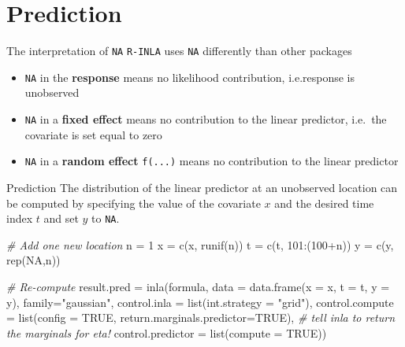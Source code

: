 \documentclass[
  ignorenonframetext,
]{beamer}
\newenvironment{Shaded}{\begin{snugshade}}{\end{snugshade}}
\newcommand{\AttributeTok}[1]{\textcolor[rgb]{0.77,0.63,0.00}{#1}}
\newcommand{\CommentTok}[1]{\textcolor[rgb]{0.56,0.35,0.01}{\textit{#1}}}
\newcommand{\ConstantTok}[1]{\textcolor[rgb]{0.00,0.00,0.00}{#1}}
\newcommand{\DecValTok}[1]{\textcolor[rgb]{0.00,0.00,0.81}{#1}}
\newcommand{\FunctionTok}[1]{\textcolor[rgb]{0.00,0.00,0.00}{#1}}
\newcommand{\NormalTok}[1]{#1}
\newcommand{\OtherTok}[1]{\textcolor[rgb]{0.56,0.35,0.01}{#1}}
\newcommand{\SpecialCharTok}[1]{\textcolor[rgb]{0.00,0.00,0.00}{#1}}
\newcommand{\StringTok}[1]{\textcolor[rgb]{0.31,0.60,0.02}{#1}}
\begin{document}
\hypertarget{prediction}{%
\section{Prediction}\label{prediction}}

\begin{frame}[fragile]{The interpretation of \texttt{NA}}
\protect\hypertarget{the-interpretation-of-na}{}
\texttt{R-INLA} uses \texttt{NA} differently than other packages

\begin{itemize}
\item
  \texttt{NA} in the \textbf{response} means no likelihood contribution,
  i.e.response is unobserved
\item
  \texttt{NA} in a \textbf{fixed effect} means no contribution to the
  linear predictor, i.e.~the covariate is set equal to zero
\item
  \texttt{NA} in a \textbf{random effect} \texttt{f(...)} means no
  contribution to the linear predictor
\end{itemize}
\end{frame}

\begin{frame}[fragile]{Prediction}
\protect\hypertarget{prediction-1}{}
The distribution of the linear predictor at an unobserved location can
be computed by specifying the value of the covariate \(x\) and the
desired time index \(t\) and set \(y\) to \texttt{NA}. \small

\begin{Shaded}
\begin{Highlighting}[]
\CommentTok{\# Add one new location}
\NormalTok{n }\OtherTok{=} \DecValTok{1}
\NormalTok{x }\OtherTok{=} \FunctionTok{c}\NormalTok{(x, }\FunctionTok{runif}\NormalTok{(n))}
\NormalTok{t }\OtherTok{=} \FunctionTok{c}\NormalTok{(t, }\DecValTok{101}\SpecialCharTok{:}\NormalTok{(}\DecValTok{100}\SpecialCharTok{+}\NormalTok{n))}
\NormalTok{y }\OtherTok{=} \FunctionTok{c}\NormalTok{(y, }\FunctionTok{rep}\NormalTok{(}\ConstantTok{NA}\NormalTok{,n))}

\CommentTok{\# Re{-}compute}
\NormalTok{result.pred }\OtherTok{=} \FunctionTok{inla}\NormalTok{(formula,}
    \AttributeTok{data =} \FunctionTok{data.frame}\NormalTok{(}\AttributeTok{x =}\NormalTok{ x, }\AttributeTok{t =}\NormalTok{ t, }\AttributeTok{y =}\NormalTok{ y),}
    \AttributeTok{family=}\StringTok{"gaussian"}\NormalTok{,}
    \AttributeTok{control.inla =} \FunctionTok{list}\NormalTok{(}\AttributeTok{int.strategy =} \StringTok{"grid"}\NormalTok{),}
    \AttributeTok{control.compute =} \FunctionTok{list}\NormalTok{(}\AttributeTok{config =} \ConstantTok{TRUE}\NormalTok{, }
                           \AttributeTok{return.marginals.predictor=}\ConstantTok{TRUE}\NormalTok{), }
    \CommentTok{\# tell inla to return the marginals for eta!  }
    \AttributeTok{control.predictor =} \FunctionTok{list}\NormalTok{(}\AttributeTok{compute =} \ConstantTok{TRUE}\NormalTok{))}
\end{Highlighting}
\end{Shaded}

\normalsize
\end{frame}
\end{document}
